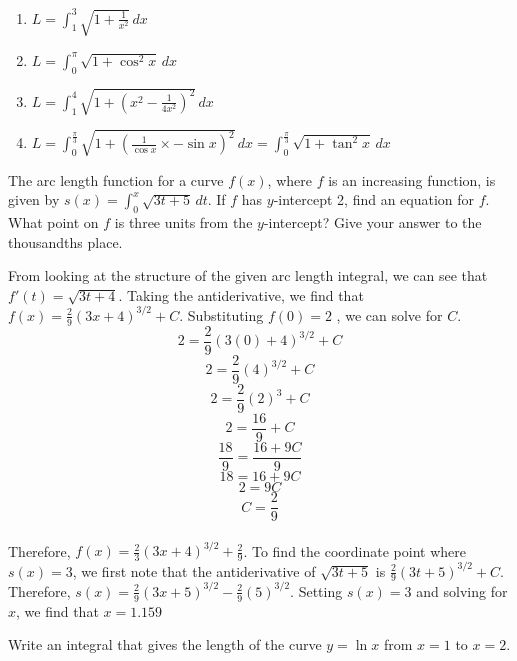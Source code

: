 \begin{Answer}[ref=length1]
	\begin{enumerate}
	\item $L = \int_{1}^{3} \sqrt{1 + \frac{1}{x^2}}\,dx$
	\item $L = \int_{0}^{\pi} \sqrt{1 + \cos^2{x}}\,dx$
	\item $L = \int_{1}^{4} \sqrt{1 + (x^2-\frac{1}{4x^2})^2}\,dx$
	\item $L = \int_{0}^{\frac{\pi}{3}} \sqrt{1 + (\frac{1}{\cos{x}} 
	\times - \sin{x})^2}\,dx = \int_{0}^{\frac{\pi}{3}} \sqrt{1 + 
	\tan^2{x}}\,dx$
	\end{enumerate}
\end{Answer}

\begin{Exercise}[label=length2]
The arc length function for a curve $f(x)$, where $f$ is an increasing 
function, is given by $s(x) = \int_{0}^{x} \sqrt{3t + 5}\,dt$. If $f$ 
has $y$-intercept 2, find an equation for $f$. What point on $f$ is 
three units from the $y$-intercept? Give your answer to the thousandths 
place. 
\end{Exercise}

\begin{Answer}[ref=length2]
From looking at the structure of the given arc length integral, we can 
see that $f'(t) = \sqrt{3t + 4}$. Taking the antiderivative, we find 
that $f(x) = \frac{2}{9}(3x + 4)^{3 / 2} + C$. Substituting $f(0) = 2$
, we can solve for $C$. $$2 = \frac{2}{9}(3(0) + 4)^{3 / 2} + C$$ 
$$2 = \frac{2}{9}(4)^{3 / 2} + C$$ 
$$2 = \frac{2}{9}(2)^3 + C$$ 
$$2 = \frac{16}{9} + C$$ 
$$\frac{18}{9} = \frac{16 + 9C}{9}$$ 
$$18 = 16 + 9C$$ 
$$2 = 9C$$ 
$$C = \frac{2}{9}$$\\ 
Therefore, $f(x) = \frac{2}{3}(3x + 4)^{3 / 2} + \frac{2}{9}$. To find 
the coordinate point where $s(x) = 3$, we first note that the 
antiderivative of $\sqrt{3t + 5}$ is $\frac{2}{9}(3t + 5)^{3 / 2} + C$. 
Therefore, $s(x) = \frac{2}{9}(3x + 5)^{3 / 2} - \frac{2}{9}(5)^{3 / 2}$. 
Setting $s(x) = 3$ and solving for $x$, we find that $x = 1.159$
\end{Answer}

\begin{Exercise} Write an 
	integral that gives the length of the curve $ y = \ln{x}$ from 
	$x = 1$ to $x = 2$. 
\end{Exercise}

